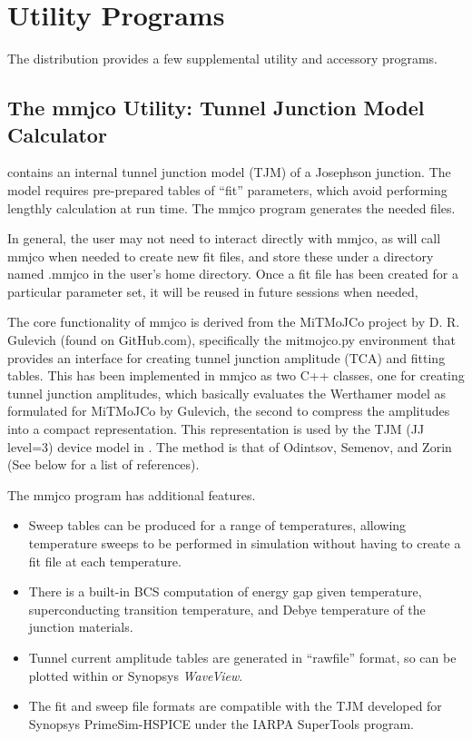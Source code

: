 
\chapter{Utility Programs}


The {\WRspice} distribution provides a few supplemental utility
and accessory programs.

\section{The {\vt mmjco} Utility: Tunnel Junction Model Calculator}


{\WRspice} contains an internal tunnel junction model (TJM) of a
Josephson junction.  The model requires pre-prepared tables of ``fit''
parameters, which avoid performing lengthly calculation at run time. 
The {\vt mmjco} program generates the needed files.

In general, the user may not need to interact directly with {\vt
mmjco}, as {\WRspice} will call {\vt mmjco} when needed to create new
fit files, and store these under a directory named {\vt .mmjco} in the
user's home directory.  Once a fit file has been created for a
particular parameter set, it will be reused in future {\WRspice}
sessions when needed,

The core functionality of {\vt mmjco} is derived from the MiTMoJCo
project by D.  R.  Gulevich (found on GitHub.com), specifically the
{\vt mitmojco.py} environment that provides an interface for creating
tunnel junction amplitude (TCA) and fitting tables.  This has been
implemented in {\vt mmjco} as two C++ classes, one for creating tunnel
junction amplitudes, which basically evaluates the Werthamer model as
formulated for MiTMoJCo by Gulevich, the second to compress the
amplitudes into a compact representation.  This representation is used
by the TJM (JJ level=3) device model in {\WRspice}.  The method is
that of Odintsov, Semenov, and Zorin (See below for a list of
references).

The {\vt mmjco} program has additional features.
\begin{itemize}
\item{Sweep tables can be produced for a range of temperatures,
allowing temperature sweeps to be performed in simulation without
having to create a fit file at each temperature.}
\item{There is a built-in BCS computation of energy gap given
temperature, superconducting transition temperature, and Debye
temperature of the junction materials.}
\item{Tunnel current amplitude tables are generated in ``rawfile''
format, so can be plotted within {\WRspice} or Synopsys
{\it WaveView}.}
\item{The fit and sweep file formats are compatible with the TJM
developed for Synopsys PrimeSim-HSPICE under the IARPA SuperTools
program.}
\end{itemize}

